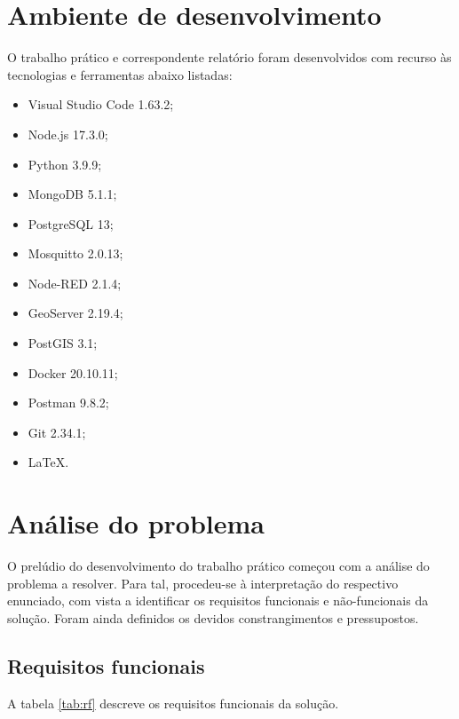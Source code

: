\section{Ambiente de desenvolvimento}

O trabalho prático e correspondente relatório foram desenvolvidos com recurso às tecnologias e ferramentas abaixo listadas:

\begin{itemize}
    \item Visual Studio Code 1.63.2;
    \item Node.js 17.3.0;
    \item Python 3.9.9;
    \item MongoDB 5.1.1;
    \item PostgreSQL 13;
    \item Mosquitto 2.0.13;
    \item Node-RED 2.1.4;
    \item GeoServer 2.19.4;
    \item PostGIS 3.1;
    \item Docker 20.10.11;
    \item Postman 9.8.2;
    \item Git 2.34.1;
    \item \LaTeX.
\end{itemize}

\clearpage

\section{Análise do problema}

O prelúdio do desenvolvimento do trabalho prático começou com a análise do problema a resolver. Para tal, procedeu-se à interpretação do respectivo enunciado, com vista a identificar os requisitos funcionais e não-funcionais da solução. Foram ainda definidos os devidos constrangimentos e pressupostos.

\subsection{Requisitos funcionais}

A tabela \ref{tab:rf} descreve os requisitos funcionais da solução.

